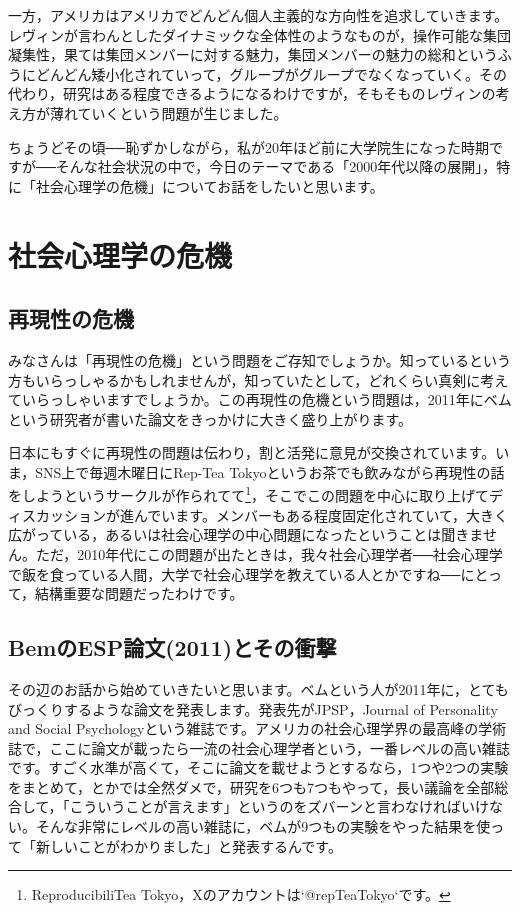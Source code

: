 \documentclass{ltjsbook}
\begin{document}
一方，アメリカはアメリカでどんどん個人主義的な方向性を追求していきます。レヴィンが言わんとしたダイナミックな全体性のようなものが，操作可能な集団凝集性，果ては集団メンバーに対する魅力，集団メンバーの魅力の総和というふうにどんどん矮小化されていって，グループがグループでなくなっていく。その代わり，研究はある程度できるようになるわけですが，そもそものレヴィンの考え方が薄れていくという問題が生じました。

ちょうどその頃──恥ずかしながら，私が20年ほど前に大学院生になった時期ですが──そんな社会状況の中で，今日のテーマである「2000年代以降の展開」，特に「社会心理学の危機」についてお話をしたいと思います。

\section{社会心理学の危機}
\subsection{再現性の危機}
みなさんは「再現性の危機」という問題をご存知でしょうか。知っているという方もいらっしゃるかもしれませんが，知っていたとして，どれくらい真剣に考えていらっしゃいますでしょうか。この再現性の危機という問題は，2011年にベムという研究者が書いた論文\parencite{Bem2011}をきっかけに大きく盛り上がります。

日本にもすぐに再現性の問題は伝わり，割と活発に意見が交換されています。いま，SNS上で毎週木曜日にRep-Tea Tokyoというお茶でも飲みながら再現性の話をしようというサークルが作られてて\footnote{ReproducibiliTea Tokyo，Xのアカウントは`@repTeaTokyo`です。}，そこでこの問題を中心に取り上げてディスカッションが進んでいます。メンバーもある程度固定化されていて，大きく広がっている，あるいは社会心理学の中心問題になったということは聞きません。ただ，2010年代にこの問題が出たときは，我々社会心理学者──社会心理学で飯を食っている人間，大学で社会心理学を教えている人とかですね──にとって，結構重要な問題だったわけです。

\subsection{BemのESP論文(2011)とその衝撃}
その辺のお話から始めていきたいと思います。ベムという人が2011年に，とてもびっくりするような論文を発表します。発表先がJPSP，Journal of Personality and Social Psychologyという雑誌です。アメリカの社会心理学界の最高峰の学術誌で，ここに論文が載ったら一流の社会心理学者という，一番レベルの高い雑誌です。すごく水準が高くて，そこに論文を載せようとするなら，1つや2つの実験をまとめて，とかでは全然ダメで，研究を6つも7つもやって，長い議論を全部総合して，「こういうことが言えます」というのをズバーンと言わなければいけない。そんな非常にレベルの高い雑誌に，ベムが9つもの実験をやった結果を使って「新しいことがわかりました」と発表するんです。
\end{document}
